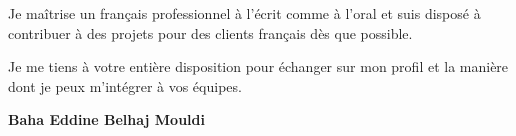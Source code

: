 \documentclass[a4paper,11pt]{article}
\begin{document}
Je maîtrise un français professionnel à l'écrit comme à l'oral et suis disposé à contribuer à des projets pour des clients français dès que possible.

Je me tiens à votre entière disposition pour échanger sur mon profil et la manière dont je peux m'intégrer à vos équipes.

\vspace{0.8cm}

\begin{flushright}
{\bfseries Baha Eddine Belhaj Mouldi}
\end{flushright}
\end{document}
